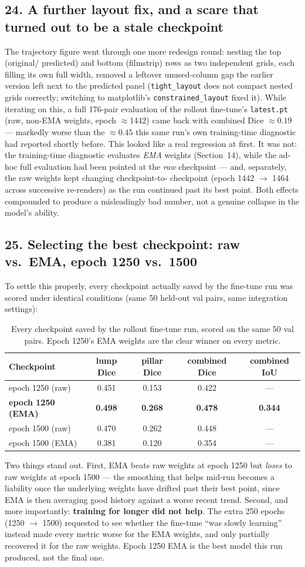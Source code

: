\documentclass[11pt]{article}
\newcommand{\hsub}[1]{\subsection*{#1}}
\begin{document}
\hsub{24. A further layout fix, and a scare that turned out to be a stale checkpoint}
The trajectory figure went through one more redesign round: nesting the top (original/
predicted) and bottom (filmstrip) rows as two independent grids, each filling its own full
width, removed a leftover unused-column gap the earlier version left next to the predicted
panel (\texttt{tight\_layout} does not compact nested grids correctly; switching to
matplotlib's \texttt{constrained\_layout} fixed it). While iterating on this, a full 176-pair
evaluation of the rollout fine-tune's \texttt{latest.pt} (raw, non-EMA weights, epoch
$\approx$1442) came back with combined Dice $\approx 0.19$ --- markedly worse than the
$\approx 0.45$ this same run's own training-time diagnostic had reported shortly before. This
looked like a real regression at first. It was not: the training-time diagnostic evaluates
\emph{EMA} weights (Section~14), while the ad-hoc full evaluation had been pointed at the
\emph{raw} checkpoint --- and, separately, the raw weights kept changing checkpoint-to-
checkpoint (epoch 1442 $\to$ 1464 across successive re-renders) as the run continued past its
best point. Both effects compounded to produce a misleadingly bad number, not a genuine
collapse in the model's ability.

\hsub{25. Selecting the best checkpoint: raw vs.\ EMA, epoch 1250 vs.\ 1500}
To settle this properly, every checkpoint actually saved by the fine-tune run was scored
under identical conditions (same 50 held-out val pairs, same integration settings):
\begin{table}[h]
\centering
\begin{tabular}{@{}lcccc@{}}
\toprule
Checkpoint & lump Dice & pillar Dice & combined Dice & combined IoU \\
\midrule
epoch 1250 (raw)      & 0.451 & 0.153 & 0.422 & --- \\
\textbf{epoch 1250 (EMA)} & \textbf{0.498} & \textbf{0.268} & \textbf{0.478} & \textbf{0.344} \\
epoch 1500 (raw)      & 0.470 & 0.262 & 0.448 & --- \\
epoch 1500 (EMA)      & 0.381 & 0.120 & 0.354 & --- \\
\bottomrule
\end{tabular}
\caption{Every checkpoint saved by the rollout fine-tune run, scored on the same 50 val pairs.
Epoch 1250's EMA weights are the clear winner on every metric.}
\label{tab:checkpoint-selection}
\end{table}
Two things stand out. First, EMA beats raw weights at epoch 1250 but \emph{loses} to raw
weights at epoch 1500 --- the smoothing that helps mid-run becomes a liability once the
underlying weights have drifted past their best point, since EMA is then averaging good
history against a worse recent trend. Second, and more importantly: \textbf{training for
longer did not help}. The extra 250 epochs (1250 $\to$ 1500) requested to see whether the
fine-tune ``was slowly learning'' instead made every metric worse for the EMA weights, and
only partially recovered it for the raw weights. Epoch 1250 EMA is the best model this run
produced, not the final one.
\end{document}
